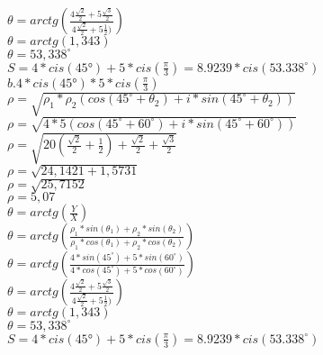 $\theta = arctg(\frac{4\frac{\sqrt{2}} {2} + 5\frac{\sqrt{3}} {2}} {4\frac{\sqrt{2}} {2} + 5\frac{1} {2})})$ \\

$\theta = arctg(1,343)$ \\

$\theta = 53,338^{\circ}$ \\

$ S = 4*cis(45°) + 5*cis(\frac{\pi}{3}) = 8.9239 * cis(53.338^{\circ})$ \\

\newpage
$b. 4*cis(45°) * 5*cis(\frac{\pi}{3})$ \\

$\rho = \sqrt{\rho_1*\rho_2 (cos(45^{\circ} + \theta_2)+ i* sin(45^{\circ}+ \theta_2)) }$ \\

$\rho = \sqrt{4*5 (cos(45^{\circ} + 60^{\circ})+ i* sin(45^{\circ}+ 60^{\circ})) }$ \\

$\rho = \sqrt{20  (\frac{\sqrt{2}}{2} + \frac{1}{2}) + \frac{\sqrt{2}} {2} + \frac{\sqrt{3}} {2} }$\\

$\rho = \sqrt{24,1421 + 1,5731 }$\\

$\rho = \sqrt{25,7152}$\\

$\rho = 5,07$\\

$\theta = arctg(\frac{Y}{X})$\\
$\theta = arctg(\frac{\rho_1 * sin(\theta_1) + \rho_2 * sin(\theta_2)} {\rho_1 * cos(\theta_1) + \rho_2 * cos(\theta_2)})$ \\

$\theta = arctg(\frac{4 * sin(45^{\circ}) + 5 * sin(60^{\circ})} {4 * cos(45^{\circ}) + 5 * cos(60^{\circ})})$ \\

$\theta = arctg(\frac{4\frac{\sqrt{2}} {2} + 5\frac{\sqrt{3}} {2}} {4\frac{\sqrt{2}} {2} + 5\frac{1} {2})})$ \\

$\theta = arctg(1,343)$ \\

$\theta = 53,338^{\circ}$ \\

$ S = 4*cis(45°) + 5*cis(\frac{\pi}{3}) = 8.9239 * cis(53.338^{\circ})$ \\
